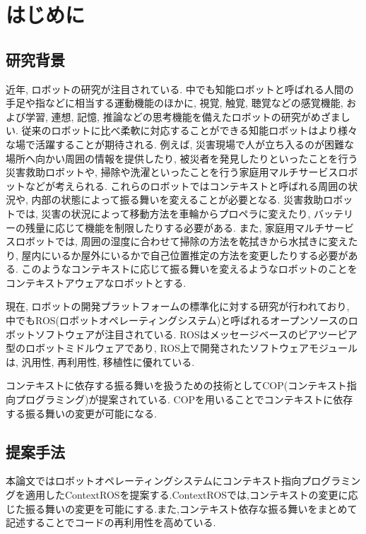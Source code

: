 
\chapter{はじめに}
\label{cha:intro}

\section{研究背景}
近年, ロボットの研究が注目されている. 中でも知能ロボットと呼ばれる人間の手足や指などに相当する運動機能のほかに, 視覚, 触覚, 聴覚などの感覚機能, および学習, 連想, 記憶, 推論などの思考機能を備えたロボットの研究がめざましい. 従来のロボットに比べ柔軟に対応することができる知能ロボットはより様々な場で活躍することが期待される. 例えば, 災害現場で人が立ち入るのが困難な場所へ向かい周囲の情報を提供したり, 被災者を発見したりといったことを行う災害救助ロボットや, 掃除や洗濯といったことを行う家庭用マルチサービスロボットなどが考えられる. これらのロボットではコンテキストと呼ばれる周囲の状況や, 内部の状態によって振る舞いを変えることが必要となる. 災害救助ロボットでは, 災害の状況によって移動方法を車輪からプロペラに変えたり, バッテリーの残量に応じて機能を制限したりする必要がある. また, 家庭用マルチサービスロボットでは, 周囲の湿度に合わせて掃除の方法を乾拭きから水拭きに変えたり, 屋内にいるか屋外にいるかで自己位置推定の方法を変更したりする必要がある. このようなコンテキストに応じて振る舞いを変えるようなロボットのことをコンテキストアウェアなロボットとする.\par
現在, ロボットの開発プラットフォームの標準化に対する研究が行われており, 中でもROS(ロボットオペレーティングシステム)と呼ばれるオープンソースのロボットソフトウェアが注目されている. ROSはメッセージベースのピアツーピア型のロボットミドルウェアであり, ROS上で開発されたソフトウェアモジュールは, 汎用性, 再利用性, 移植性に優れている.\par
コンテキストに依存する振る舞いを扱うための技術としてCOP(コンテキスト指向プログラミング)が提案されている. COPを用いることでコンテキストに依存する振る舞いの変更が可能になる.

\section{提案手法}
本論文ではロボットオペレーティングシステムにコンテキスト指向プログラミングを適用したContextROSを提案する.ContextROSでは,コンテキストの変更に応じた振る舞いの変更を可能にする.また,コンテキスト依存な振る舞いをまとめて記述することでコードの再利用性を高めている.



